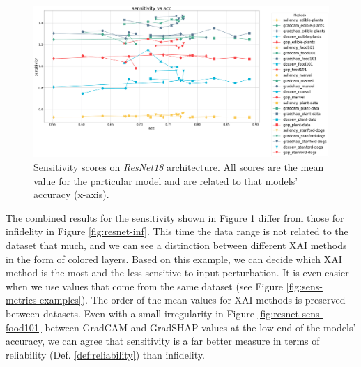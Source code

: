 \begin{figure}[ht]
  \centering
    \centering
    \includegraphics[width=\textwidth]{results/metrics/resnet18-sensitivity vs acc.png}
    \caption{Sensitivity scores on \textit{ResNet18} architecture. All scores are the mean value for the particular model and are related to that models' accuracy (x-axis).}\label{fig:resnet-sens}
\end{figure}

The combined results for the sensitivity shown in Figure \ref{fig:resnet-sens} differ from those for infidelity in Figure \ref{fig:resnet-inf}. This time the data range is not related to the dataset that much, and we can see a distinction between different XAI methods in the form of colored layers. Based on this example, we can decide which XAI method is the most and the less sensitive to input perturbation. It is even easier when we use values that come from the same dataset (see Figure \ref{fig:sens-metrics-examples}). The order of the mean values for XAI methods is preserved between datasets. Even with a small irregularity in Figure \ref{fig:resnet-sens-food101} between GradCAM and GradSHAP values at the low end of the models' accuracy, we can agree that sensitivity is a far better measure in terms of reliability (Def. \ref{def:reliability}) than infidelity.

